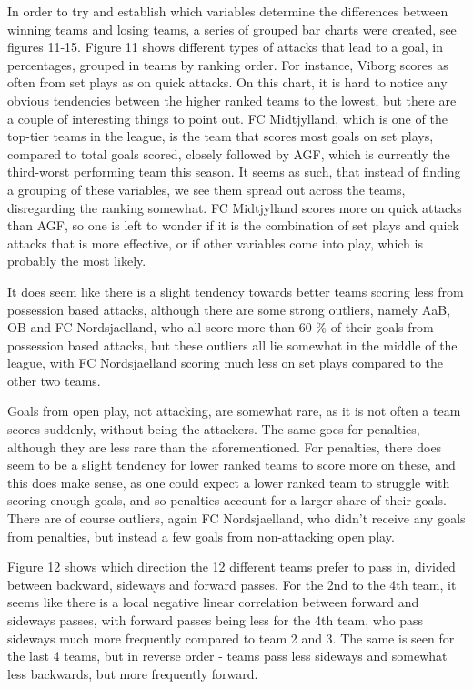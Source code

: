 \documentclass[Report.tex]{subfiles}
\begin{document}
In order to try and establish which variables determine the differences between
winning teams and losing teams, a series of grouped bar charts were created, see
figures 11-15. Figure 11 shows different types of attacks that lead to a goal,
in percentages, grouped in teams by ranking order. For instance, Viborg scores
as often from set plays as on quick attacks.
On this chart, it is hard to notice any obvious tendencies between the higher
ranked teams to the lowest, but there are a couple of interesting things to
point out. FC Midtjylland, which is one of the top-tier teams in the league, is
the team that scores most goals on set plays, compared to total goals scored,
closely followed by AGF, which is currently the third-worst performing team
this season. It seems as such, that instead of finding a grouping of these
variables, we see them spread out across the teams, disregarding the ranking
somewhat. FC Midtjylland scores more on quick attacks than AGF, so one is left
to wonder if it is the combination of set plays and quick attacks that is more
effective, or if other variables come into play, which is probably the most
likely. 

It does seem like there is a slight tendency towards better teams scoring less
from possession based attacks, although there are some strong outliers, namely
AaB, OB and FC Nordsjaelland, who all score more than 60 \% of their
goals from possession based attacks, but these outliers all lie somewhat in the
middle of the league, with FC Nordsjaelland scoring much less on set plays
compared to the other two teams. 

Goals from open play, not attacking, are somewhat rare, as it is not often a
team scores suddenly, without being the attackers. The same goes for penalties,
although they are less rare than the aforementioned. For penalties, there does
seem to be a slight tendency for lower ranked teams to score more on these, and
this does make sense, as one could expect a lower ranked team to struggle with
scoring enough goals, and so penalties account for a larger share of their
goals. There are of course outliers, again FC Nordsjaelland, who didn't receive
any goals from penalties, but instead a few goals from non-attacking open play. 

Figure 12 shows which direction the 12 different teams prefer to pass in,
divided between backward, sideways and forward passes. For the 2nd to the 4th
team, it seems like there is a local negative linear correlation between forward
and sideways passes, with forward passes being less for the 4th team, who pass
sideways much more frequently compared to team 2 and 3. The same is seen for the
last 4 teams, but in reverse order - teams pass less sideways and somewhat less
backwards, but more frequently forward. 
\end{document}
